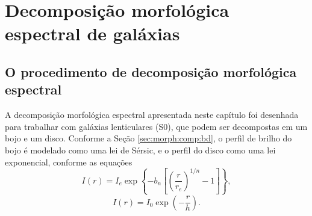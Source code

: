


\chapter{Decomposição morfológica espectral de galáxias}
\label{sec:Decomp}


\section{O procedimento de decomposição morfológica espectral}

A decomposição morfológica espectral apresentada neste capítulo foi desenhada
para trabalhar com galáxias lenticulares (S0), que podem ser decompostas em um
bojo e um disco. Conforme a Seção \ref{sec:morph:comp:bd}, o perfil de brilho do
bojo é modelado como uma lei de Sérsic, e o perfil do disco como uma lei
exponencial, conforme as equações
\begin{equation*}
I(r) = I_e \exp \left\{- b_n \left[ \left( \frac{r}{r_e} \right)^{1/n}
- 1 \right] \right\},
\end{equation*}
\begin{equation*}
I(r) = I_0 \exp\left(- \frac{r}{h}\right).
\end{equation*}

